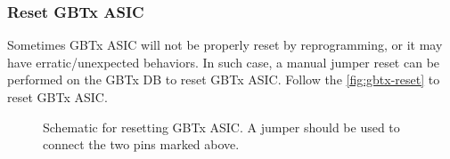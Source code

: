 \subsubsection{Reset GBTx ASIC}
Sometimes GBTx ASIC will not be properly reset by reprogramming, or it may have
erratic/unexpected behaviors.
In such case, a manual jumper reset can be performed on the GBTx DB to reset
GBTx ASIC.
Follow the \autoref{fig:gbtx-reset} to reset GBTx ASIC.

\begin{figure}[!ht]
\centering
{}
\caption{
    Schematic for resetting GBTx ASIC. A jumper should be used to connect the
    two pins marked above.
}
\label{fig:gbtx-reset}
\end{figure}
